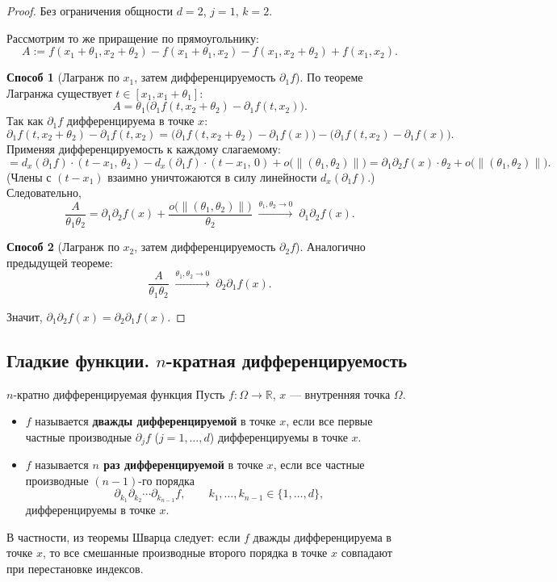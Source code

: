\begin{proof}
	Без ограничения общности $d=2$, $j=1$, $k=2$.
	
	Рассмотрим то же приращение по прямоугольнику:
	\[
	A := f(x_1+\theta_1,x_2+\theta_2)
	- f(x_1+\theta_1,x_2)
	- f(x_1,x_2+\theta_2)
	+ f(x_1,x_2).
	\]
	
	\textbf{Способ 1} (Лагранж по $x_1$, затем дифференцируемость $\partial_1 f$).
	По теореме Лагранжа существует $t\in[x_1,x_1+\theta_1]$:
	\[
	A = \theta_1\bigl(\partial_1 f(t,x_2+\theta_2)-\partial_1 f(t,x_2)\bigr).
	\]
	Так как $\partial_1 f$ дифференцируема в точке $x$:
	\[
	\partial_1 f(t,x_2+\theta_2)-\partial_1 f(t,x_2)
	= \bigl(\partial_1 f(t,x_2+\theta_2)-\partial_1 f(x)\bigr)
	- \bigl(\partial_1 f(t,x_2)-\partial_1 f(x)\bigr).
	\]
	Применяя дифференцируемость к каждому слагаемому:
	\[
	= d_x(\partial_1 f)\cdot(t-x_1,\,\theta_2)
	- d_x(\partial_1 f)\cdot(t-x_1,\,0)
	+ o\bigl(\|(\theta_1,\theta_2)\|\bigr)
	= \partial_1\partial_2 f(x)\cdot\theta_2
	+ o\bigl(\|(\theta_1,\theta_2)\|\bigr).
	\]
	(Члены с $(t-x_1)$ взаимно уничтожаются в силу линейности $d_x(\partial_1 f)$.)
	Следовательно,
	\[
	\frac{A}{\theta_1\theta_2}
	= \partial_1\partial_2 f(x) + \frac{o\bigl(\|(\theta_1,\theta_2)\|\bigr)}{\theta_2}
	\;\xrightarrow{\theta_1,\theta_2\to0}\;\partial_1\partial_2 f(x).
	\]
	
	\textbf{Способ 2} (Лагранж по $x_2$, затем дифференцируемость $\partial_2 f$).
	Аналогично предыдущей теореме:
	\[
	\frac{A}{\theta_1\theta_2}\;\xrightarrow{\theta_1,\theta_2\to0}\;\partial_2\partial_1 f(x).
	\]
	
	Значит, $\partial_1\partial_2 f(x)=\partial_2\partial_1 f(x)$.
\end{proof}

\subsection{Гладкие функции. \texorpdfstring{$n$}{n}-кратная дифференцируемость}

\begin{Definition}{$n$-кратно дифференцируемая функция}{}
	Пусть $f\colon\Omega\to\mathbb{R}$, $x$ --- внутренняя точка $\Omega$.
	
	\begin{itemize}
		\item $f$ называется \textbf{дважды дифференцируемой} в точке $x$, если все
		первые частные производные $\partial_j f$ ($j=1,\dots,d$) дифференцируемы
		в точке $x$.
		
		\item $f$ называется \textbf{$n$ раз дифференцируемой} в точке $x$, если все
		частные производные $(n-1)$-го порядка
		\[
		\partial_{k_1}\partial_{k_2}\cdots\partial_{k_{n-1}} f,
		\qquad k_1,\dots,k_{n-1}\in\{1,\dots,d\},
		\]
		дифференцируемы в точке $x$.
	\end{itemize}
\end{Definition}

\begin{Remark}{}{}
	В частности, из теоремы Шварца следует: если $f$ дважды дифференцируема в точке $x$,
	то все смешанные производные второго порядка в точке $x$ совпадают при перестановке
	индексов.
\end{Remark}